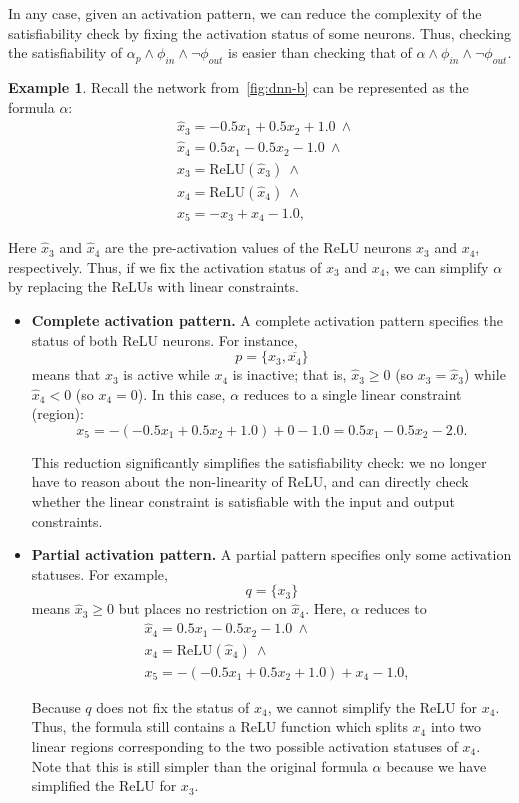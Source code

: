 \documentclass[oneside,11pt,dvipsnames]{book}
\numberwithin{equation}{section}
\theoremstyle{definition}
\newtheorem{example}{Example}[section]
\theoremstyle{remark}
\newcommand{\relu}[1]{\mathrm{ReLU}\left(#1\right)}
\begin{document}
In any case, given an activation pattern, we can reduce the complexity of the satisfiability check by fixing the activation status of some neurons. Thus, checking the satisfiability of $\alpha_p \land \phi_{in} \land \neg \phi_{out}$ is easier than checking that of $\alpha \land \phi_{in} \land \neg \phi_{out}$.


\begin{example}
Recall the network from~\autoref{fig:dnn-b} can be represented as the formula $\alpha$:
\[
\begin{aligned}
& \hat{x}_3 = -0.5x_1 + 0.5x_2 + 1.0 ~\land\\
& \hat{x}_4 = 0.5x_1 - 0.5x_2 - 1.0 ~\land\\
& x_3 = \relu{\hat{x}_3} ~\land \\
& x_4 = \relu{\hat{x}_4} ~\land \\
& x_5 = -x_3 + x_4 - 1.0,
\end{aligned}
\]

Here $\hat{x}_3$ and $\hat{x}_4$ are the pre-activation values of the ReLU neurons $x_3$ and $x_4$, respectively.
Thus, if we fix the activation status of $x_3$ and $x_4$, we can simplify $\alpha$ by replacing the ReLUs with linear constraints.


\begin{itemize}
  \item \textbf{Complete activation pattern.}
  A complete activation pattern specifies the status of both ReLU neurons.
  For instance,
  \[
  p = \{x_3, \overline{x_4}\}
  \]
  means that $x_3$ is active while $x_4$ is inactive; that is, $\hat{x}_3 \geq 0$ (so $x_3 = \hat{x}_3$) while $\hat{x}_4 < 0$ (so $x_4 = 0$).
  In this case, $\alpha$ reduces to a single linear constraint (region):
  \[
  x_5 = -(-0.5x_1 + 0.5x_2 + 1.0) + 0 - 1.0 = 0.5x_1 - 0.5x_2 - 2.0 .
  \]
    
  This reduction significantly simplifies the satisfiability check: we no longer have to reason about the non-linearity of ReLU, and can directly check whether the linear constraint is satisfiable with the input and output constraints.

  \item \textbf{Partial activation pattern.}
  A partial pattern specifies only some activation statuses.
  For example,
  \[
  q = \{x_3\}
  \]
  means $\hat{x}_3 \geq 0$ but places no restriction on $\hat{x}_4$.  Here, $\alpha$ reduces to
\[
\begin{aligned}
& \hat{x}_4 = 0.5x_1 - 0.5x_2 - 1.0 ~\land\\
& x_4 = \relu{\hat{x}_4} ~\land \\
& x_5 = -(-0.5x_1 + 0.5x_2 + 1.0) + x_4 - 1.0,
\end{aligned}
\]

Because $q$ does not fix the status of $x_4$, we cannot simplify the ReLU for $x_4$. Thus, the formula still contains a ReLU function which splits $x_4$ into two linear regions corresponding to the two possible activation statuses of $x_4$.  Note that this is still simpler than the original formula $\alpha$ because we have simplified the ReLU for $x_3$.
\end{itemize}
\end{example}
\end{document}
